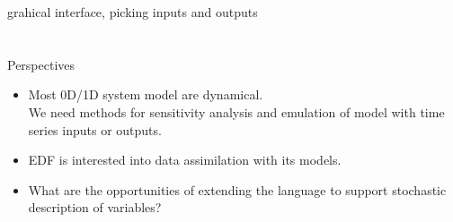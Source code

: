 \documentclass{beamer}
\begin{document}
\begin{frame}{\otfmi{} grahical interface, picking inputs and outputs}
\end{frame}

\section*{}

\begin{frame}{Perspectives}
  \begin{itemize}
  \item Most 0D/1D system model are dynamical.\\
    We need methods for sensitivity analysis and emulation of model with \alert{time series inputs or outputs}.
    \vfill
  \item EDF is interested into \alert{data assimilation} with its \lmodelica{} models.
    \vfill
  \item What are the opportunities of \alert{extending the \lmodelica{} language} to support stochastic description of variables?
  \end{itemize}
\end{frame}

\section*{}
\pagestyle{empty}
\begin{frame}
\vfill
\vfill
\hfill{}\huge{}

\end{frame}
\end{document}
